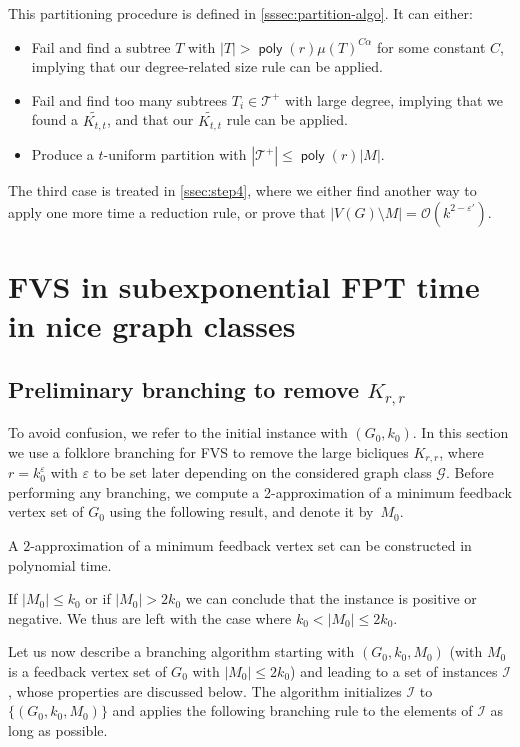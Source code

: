 \documentclass{amsart}
\newcommand{\G}{\mathcal{G}}
\newcommand{\I}{\mathcal{I}}
\newcommand{\eps}{\varepsilon}
\newcommand{\mT}{\mathcal{T}}
\newcommand{\KttTilde}{\widetilde{K_{t,t}}}
\DeclareMathOperator\poly{\textsf{poly}}
\newcommand{\FVS}{\textsc{FVS}\xspace}
\renewcommand{\O}{\mathcal{O}}
\begin{document}
 This partitioning procedure is defined in \autoref{sssec:partition-algo}. 
 It can either: 
 \begin{itemize}
     \item Fail and find a subtree $T$ with $|T|>\poly(r)\mu(T)^{C\alpha}$ for some constant $C$, implying that our degree-related size rule can be applied.
     \item Fail and find too many subtrees $T_i \in \mT^+$ with large degree, implying that we found a $\KttTilde$, and that our $\KttTilde$ rule can be applied.
     \item Produce a $t$-uniform partition with $|\mT^+| \le \poly(r)|M|$.
 \end{itemize}
 The third case is treated in \autoref{ssec:step4}, where we either find another way to apply one more time a reduction rule, or prove that $|V(G)\setminus M|= \O(k^{2-\eps'})$.
 

\section{FVS in subexponential FPT time in nice graph classes}\label{sec:algo}




\subsection{Preliminary branching to remove \texorpdfstring{$K_{r,r}$}{Krr}}\label{ssec:Krr_branch}
To avoid confusion, we refer to the initial instance with $(G_0,k_0)$. In this section we use a folklore branching for \FVS to remove the large bicliques $K_{r,r}$, where $r=k_0^{\eps}$ with $\eps$ to be set later depending on the considered graph class $\G$.
Before performing any branching, we compute a 2-approximation of a minimum feedback vertex set of $G_0$ using the following result, and denote it by~$M_0$.
\begin{theorem}\label{th:fvsapprox}
    A $2$-approximation of a minimum feedback vertex set can be constructed in polynomial time.
\end{theorem}
If $|M_0|\le k_0$ or if $|M_0|> 2k_0$ we can conclude that the instance is positive or negative. We thus are left with the case where $k_0 < |M_0| \le 2k_0$.




Let us now describe a branching algorithm starting with $(G_0, k_0, M_0)$ (with  $M_0$ is a feedback vertex set of $G_0$ with $|M_0|\le 2k_0$) and leading to a set of instances $\I$, whose properties are discussed below.
The algorithm initializes $\I$ to $\{(G_0, k_0, M_0)\}$ and applies the following branching rule to the elements of $\I$ as long as possible.
\end{document}
